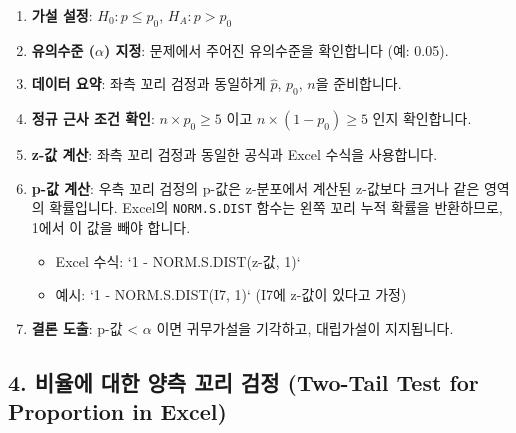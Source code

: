 \documentclass[11pt,a4paper]{article}
\begin{document}
\begin{enumerate}
    \item \textbf{가설 설정}: $H_0: p \le p_0$, $H_A: p > p_0$
    \item \textbf{유의수준 ($\alpha$) 지정}: 문제에서 주어진 유의수준을 확인합니다 (예: 0.05).
    \item \textbf{데이터 요약}: 좌측 꼬리 검정과 동일하게 $\hat{p}$, $p_0$, $n$을 준비합니다.
    \item \textbf{정규 근사 조건 확인}: $n \times p_0 \ge 5$ 이고 $n \times (1 - p_0) \ge 5$ 인지 확인합니다.
    \item \textbf{z-값 계산}: 좌측 꼬리 검정과 동일한 공식과 Excel 수식을 사용합니다.
    \item \textbf{p-값 계산}: 우측 꼬리 검정의 p-값은 z-분포에서 계산된 z-값보다 크거나 같은 영역의 확률입니다. Excel의 \texttt{NORM.S.DIST} 함수는 왼쪽 꼬리 누적 확률을 반환하므로, 1에서 이 값을 빼야 합니다.
    \begin{itemize}
        \item Excel 수식: `1 - NORM.S.DIST(z-값, 1)`
        \item 예시: `1 - NORM.S.DIST(I7, 1)` (I7에 z-값이 있다고 가정)
    \end{itemize}
    \item \textbf{결론 도출}: p-값 < $\alpha$ 이면 귀무가설을 기각하고, 대립가설이 지지됩니다.
\end{enumerate}

\subsection*{4. 비율에 대한 양측 꼬리 검정 (Two-Tail Test for Proportion in Excel)}
\end{document}
